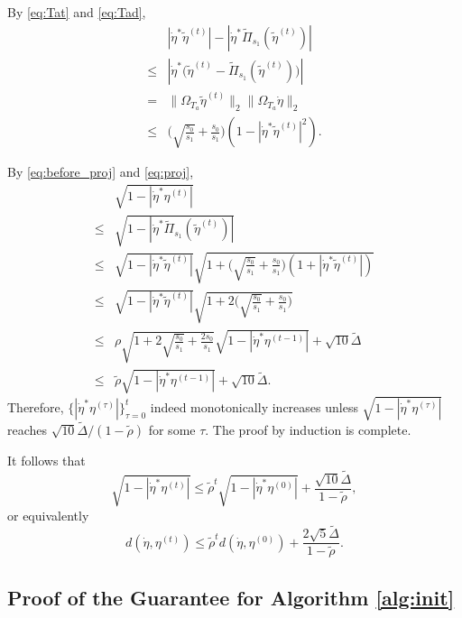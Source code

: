 \documentclass[11pt,journal]{IEEEtran}
\newcommand{\norm}[1]{\|{#1}\|}
\begin{document}
\begin{IEEEproof}
\begin{equation}
\end{equation}
By \eqref{eq:Tat} and \eqref{eq:Tad},
\begin{align}
\nonumber & |\dot{\eta}^*\tilde{\eta}^{(t)}| - |\dot{\eta}^*\widetilde{\Pi}_{s_1}(\tilde{\eta}^{(t)})| \\
\nonumber \leq & |\dot{\eta}^*\bigl(\tilde{\eta}^{(t)}-\widetilde{\Pi}_{s_1}(\tilde{\eta}^{(t)})\bigr)| \\
\nonumber = & \norm{\Omega_{T_a} \tilde{\eta}^{(t)}}_2\norm{\Omega_{T_a} \dot{\eta}}_2 \\
\label{eq:proj} \leq & \Big(\sqrt{\frac{s_0}{s_1}} + \frac{s_0}{s_1}\Big) (1-|\dot{\eta}^*\tilde{\eta}^{(t)}|^2).
\end{align}

By \eqref{eq:before_proj} and \eqref{eq:proj},
\begin{align*}
& \sqrt{1-|\dot{\eta}^* \eta^{(t)}|} \\
\leq & \sqrt{1-|\dot{\eta}^* \widetilde{\Pi}_{s_1}(\tilde{\eta}^{(t)})|} \\
\leq & \sqrt{1-|\dot{\eta}^* \tilde{\eta}^{(t)}|} \sqrt{1 + \Big(\sqrt{\frac{s_0}{s_1}} + \frac{s_0}{s_1}\Big)(1 + |\dot{\eta}^* \tilde{\eta}^{(t)}|)} \\
\leq & \sqrt{1-|\dot{\eta}^* \tilde{\eta}^{(t)}|} \sqrt{1 + 2\Big(\sqrt{\frac{s_0}{s_1}} + \frac{s_0}{s_1}\Big)} \\
\leq & \rho \sqrt{1 + 2\sqrt{\frac{s_0}{s_1}} + \frac{2s_0}{s_1}} \sqrt{1 - | \dot{\eta}^* \eta^{(t-1)} |} + \sqrt{10}\widetilde{\Delta} \\
\leq & \tilde{\rho} \sqrt{1 - | \dot{\eta}^* \eta^{(t-1)} |} + \sqrt{10}\widetilde{\Delta}.
\end{align*}
Therefore, $\{|\dot{\eta}^* \eta^{(\tau)}|\}_{\tau=0}^t$ indeed monotonically increases unless $\sqrt{1-|\dot{\eta}^* \eta^{(\tau)}|}$ reaches $\sqrt{10}\widetilde{\Delta}/(1-\tilde{\rho})$ for some $\tau$. The proof by induction is complete.

It follows that
\[
\sqrt{1-|\dot{\eta}^* \eta^{(t)}|} \leq \tilde{\rho}^t \sqrt{1-|\dot{\eta}^* \eta^{(0)}|} + \frac{\sqrt{10}\widetilde{\Delta}}{1-\tilde{\rho}},
\]
or equivalently
\[
d(\dot{\eta}, \eta^{(t)}) \leq \tilde{\rho}^t
d(\dot{\eta}, \eta^{(0)}) + \frac{2\sqrt{5}\widetilde{\Delta}}{1-\tilde{\rho}}.
\]
\end{IEEEproof}



\subsection{Proof of the Guarantee for Algorithm \ref{alg:init}}
\end{document}
